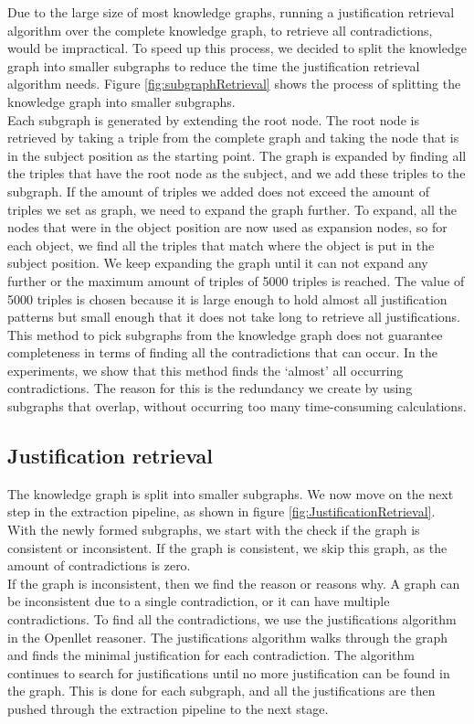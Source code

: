 \documentclass[11pt,letterpaper ,oneside ]{book}
\begin{document}
	
	Due to the large size of most knowledge graphs, running a justification retrieval algorithm over the complete knowledge graph, to retrieve all contradictions, would be impractical. To speed up this process, we decided to split the knowledge graph into smaller subgraphs to reduce the time the justification retrieval algorithm needs. Figure \ref{fig:subgraphRetrieval} shows the process of splitting the knowledge graph into smaller subgraphs.\\
	Each subgraph is generated by extending the root node. The root node is retrieved by taking a triple from the complete graph and taking the node that is in the subject position as the starting point. The graph is expanded by finding all the triples that have the root node as the subject, and we add these triples to the subgraph. If the amount of triples we added does not exceed the amount of triples we set as graph, we need to expand the graph further. To expand, all the nodes that were in the object position are now used as expansion nodes, so for each object, we find all the triples that match where the object is put in the subject position. We keep expanding the graph until it can not expand any further or the maximum amount of triples of 5000 triples is reached. The value of 5000 triples is chosen because it is large enough to hold almost all justification patterns but small enough that it does not take long to retrieve all justifications.\\
	This method to pick subgraphs from the knowledge graph does not guarantee completeness in terms of finding all the contradictions that can occur. In the experiments, we show that this method finds the `almost' all occurring contradictions. The reason for this is the redundancy we create by using subgraphs that overlap, without occurring too many time-consuming calculations. 
	
	\subsection{Justification retrieval}
	The knowledge graph is split into smaller subgraphs. We now move on the next step in the extraction pipeline, as shown in figure \ref{fig:JustificationRetrieval}.
	With the newly formed subgraphs, we start with the check if the graph is consistent or inconsistent. If the graph is consistent, we skip this graph, as the amount of contradictions is zero.\\ 
	If the graph is inconsistent, then we find the reason or reasons why. A graph can be inconsistent due to a single contradiction, or it can have multiple contradictions. 
	To find all the contradictions, we use the justifications algorithm in the Openllet reasoner. The justifications algorithm walks through the graph and finds the minimal justification for each contradiction. The algorithm continues to search for justifications until no more justification can be found in the graph. This is done for each subgraph, and all the justifications are then pushed through the extraction pipeline to the next stage.\\
	
\end{document}
